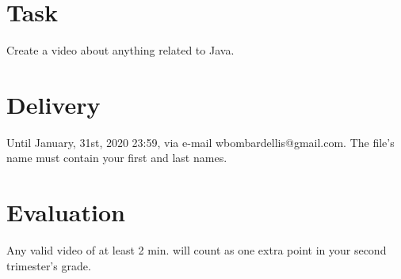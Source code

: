 \documentclass[a4paper]{article}
\begin{document}
	
	
	
	\section{Task}
	Create a video about anything related to Java.
	
	\section{Delivery}
	Until January, 31st, 2020 23:59, via e-mail wbombardellis@gmail.com. The file's name must contain your first and last names.

	\section{Evaluation}
	Any valid video of at least 2 min. will count as one extra point in your second trimester's grade.
\end{document}
